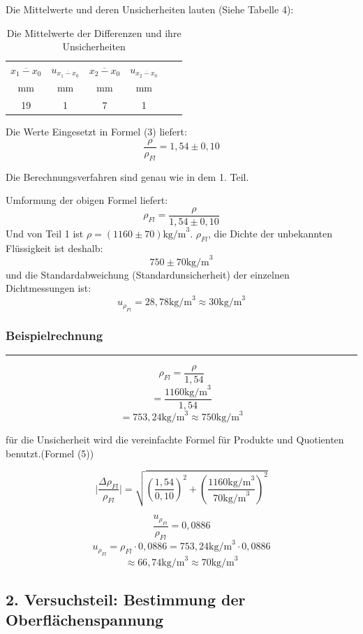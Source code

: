 \documentclass[11pt,a4paper]{article} %
\begin{document}
Die Mittelwerte und deren Unsicherheiten lauten (Siehe Tabelle 4):


\begin{table}[ht]
	\begin{tabular*}{0.99\textwidth}{@{\extracolsep{\fill}}cccccc}
		\toprule
		$\overline{x_1-x_0}$ & $u_{\overline{x_1-x_0}}$ &  $\overline{x_2-x_0}$  &  $u_{\overline{x_2-x_0}}$  \\
		mm & mm &  mm & mm   \\
		\midrule
		19 & 1 & 7 & 1 \\
		
		\bottomrule
	\end{tabular*}
	\caption{Die Mittelwerte der Differenzen und ihre Unsicherheiten}
	\label{tabelle4}
\end{table}

Die Werte Eingesetzt in Formel (3) liefert:
$$\frac{\rho}{\rho_{Fl}}=1,54\pm0,10$$

Die Berechnungsverfahren sind genau wie in dem 1. Teil. 

Umformung der obigen Formel liefert:
$$\rho_{Fl}=\frac{\rho}{1,54\pm0,10}$$
Und von Teil 1 ist $\rho=(1160\pm70) \textrm{kg/m}^3$. $\rho_{Fl}$, die Dichte der unbekannten Flüssigkeit ist deshalb:
$$750 \pm 70 \textrm{kg/m}^3$$
und die Standardabweichung (Standardunsicherheit) der einzelnen Dichtmessungen ist:
$$u_{\rho_{Fl}}=28,78\textrm{kg/m}^3\approx30\textrm{kg/m}^3$$

\subsubsection{Beispielrechnung}

\hrule
\begin{tcolorbox}[colback=white]
$$\rho_{Fl}=\frac{\rho}{1,54}$$
$$=\frac{1160 \textrm{kg/m}^3 }{1,54}$$
$$=753,24 \textrm{kg/m}^3\approx 750 \textrm{kg/m}^3$$

für die Unsicherheit wird die vereinfachte Formel für Produkte und Quotienten benutzt.(Formel (5))


$$\vert\frac{\Delta{\rho_{Fl}}}{\rho_{Fl}}\vert = \sqrt{(\frac{1,54}{0,10})^2+(\frac{1160 \textrm{kg/m}^3}{70\textrm{kg/m}^3})^2}$$

$$\frac{u_{\rho_{Fl}}}{\rho_{Fl}} = 0,0886$$
$$u_{\rho_{Fl}}={\rho_{Fl}}\cdot0,0886=753,24\textrm{kg/m}^3\cdot0,0886$$
$$\approx66,74\textrm{kg/m}^3\approx70\textrm{kg/m}^3$$
\end{tcolorbox}
\newpage

\subsection{2. Versuchsteil: Bestimmung der Oberflächenspannung}
\end{document}
